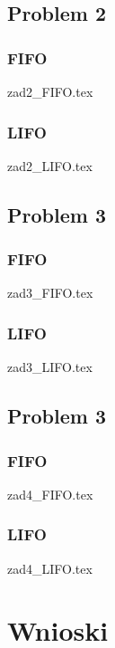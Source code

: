 \documentclass[twoside]{kInzynierka}
\begin{document}
\newpage
\subsection     {Problem 2}
\subsubsection  {FIFO}
 {zad2_FIFO.tex}
\subsubsection  {LIFO}
 {zad2_LIFO.tex}

\newpage
\subsection     {Problem 3}
\subsubsection  {FIFO}
 {zad3_FIFO.tex}
\subsubsection  {LIFO}
 {zad3_LIFO.tex}

\newpage
\subsection     {Problem 3}
\subsubsection  {FIFO}
 {zad4_FIFO.tex}
\subsubsection  {LIFO}
 {zad4_LIFO.tex}

\section        {Wnioski}

   
\end{document}
